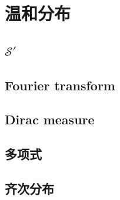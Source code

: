 \section{温和分布}
\label{b2:sec:0503}


\subsection{\texorpdfstring{\(\mathcal S'\)}{'}}
\label{b2:subsec:050301}

\subsection{Fourier transform}
\label{b2:subsec:050302}

\subsection{Dirac measure}
\label{b2:subsec:050303}

\subsection{多项式}
\label{b2:subsec:050304}

\subsection{齐次分布}
\label{b2:subsec:050305}


